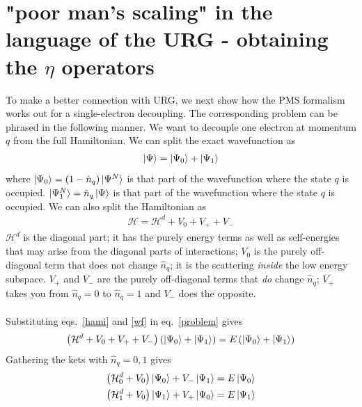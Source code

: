 \documentclass[twoside,11pt]{report}
\numberwithin{equation}{section}
\begin{document}
\section{"poor man's scaling" in the language of the URG - obtaining the \(\eta\) operators}
To make a better connection with URG, we next show how the PMS formalism works out for a single-electron decoupling. The corresponding problem can be phrased in the following manner. We want to decouple one electron at momentum \(q\) from the full Hamiltonian. We can split the exact wavefunction as
\begin{equation}\begin{aligned}
	\label{wf}
\ket{\Psi} = \ket{\Psi_0} + \ket{\Psi_1}
\end{aligned}\end{equation}
where \(\ket{\Psi_0} = \left(1 - \hat n_{q}\right)\ket{\Psi^N}\) is that part of the wavefunction where the state \(q\) is occupied. \(\ket{\Psi^N_1} = \hat n_q \ket{\Psi}\) is that part of the wavefunction where the state \(q\) is occupied. We can also split the Hamiltonian as
\begin{equation}\begin{aligned}
	\label{hami}
\mathcal{H} = \mathcal{H}^d + V_0 + V_+ + V_-
\end{aligned}\end{equation}
\(\mathcal{H}^d\) is the diagonal part; it has the purely energy terms as well as self-energies that may arise from the diagonal parts of interactions; \(V_0\) is the purely off-diagonal term that does not change \(\hat n_q\); it is the scattering \textit{inside} the low energy subspace. \(V_+\) and \(V_-\) are the purely off-diagonal terms that \textit{do} change \(\hat n_q\); \(V_+\) takes you from \(\hat n_q = 0\) to \(\hat n_q = 1\) and \(V_-\) does the opposite.
\\\\Substituting eqs.~\ref{hami} and \ref{wf} in eq.~\ref{problem} gives
\begin{equation}\begin{aligned}
	\left(\mathcal{H}^d + V_0 + V_+ + V_-\right)\left(\ket{\Psi_0} + \ket{\Psi_1}\right) = E\left(\ket{\Psi_0} + \ket{\Psi_1}\right)
\end{aligned}\end{equation}
Gathering the kets with \(\hat n_q = 0,1\) gives
\begin{equation}\begin{aligned}
	\left(\mathcal{H}^d_0 + V_0\right)\ket{\Psi_0} + V_- \ket{\Psi_1} = E\ket{\Psi_0}\\
	\left(\mathcal{H}^d_1 + V_0\right)\ket{\Psi_1} + V_+\ket{\Psi_0} = E\ket{\Psi_1}
\end{aligned}\end{equation}
\end{document}
